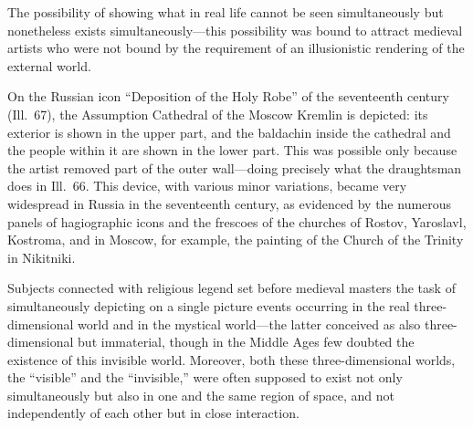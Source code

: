 
The possibility of showing what in real life cannot be seen simultaneously but
nonetheless exists simultaneously---this possibility was bound to attract medieval artists
who were not bound by the requirement of an illusionistic rendering of the external world.

On the Russian icon ``Deposition of the Holy Robe'' of the seventeenth century (Ill.~67),
the Assumption Cathedral of the Moscow Kremlin is depicted: its exterior is shown in the
upper part, and the baldachin inside the cathedral and the people within it are shown in
the lower part.  This was possible only because the artist removed part of the outer
wall---doing precisely what the draughtsman does in Ill.~66.  This device, with various
minor variations, became very widespread in Russia in the seventeenth century, as evidenced
by the numerous panels of hagiographic icons and the frescoes of the churches of Rostov,
Yaroslavl, Kostroma, and in Moscow, for example, the painting of the Church of the
Trinity in Nikitniki.

Subjects connected with religious legend set before medieval masters the task of
simultaneously depicting on a single picture events occurring in the real three-dimensional
world and in the mystical world---the latter conceived as also three-dimensional but
immaterial, though in the Middle Ages few doubted the existence of this invisible world.
Moreover, both these three-dimensional worlds, the ``visible'' and the ``invisible,'' were
often supposed to exist not only simultaneously but also in one and the same region of
space, and not independently of each other but in close interaction.


